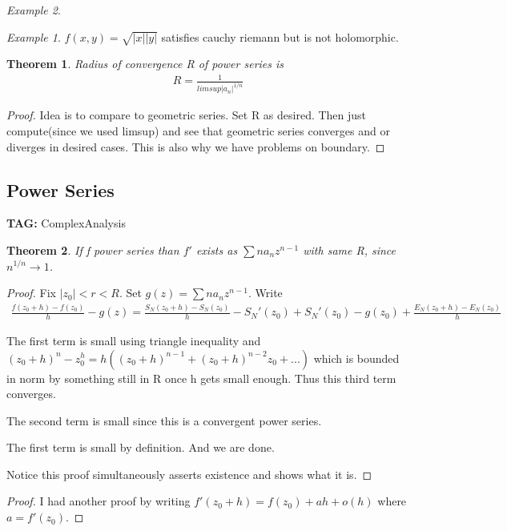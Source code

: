 \documentclass[11pt]{article}
\newtheorem{theorem}{Theorem}
\theoremstyle{remark}
\newtheorem{example}{Example}
\begin{document}
\begin{example}
\begin{example}
	$f(x,y) = \sqrt{|x||y|}$ satisfies cauchy riemann but is  not holomorphic. 
\end{example}

\begin{theorem}
	Radius of convergence R of power series is
	\begin{align*}
		R = \frac{1}{limsup |a_n|^{1/n}}
	\end{align*}
\end{theorem}

\begin{proof}
	Idea is to compare to geometric series. Set R as desired. Then just compute(since we used limsup) and see that geometric series converges and or diverges in desired cases. This is also why we have problems on boundary. 
\end{proof}

\subsection{Power Series}

\textbf{TAG:} ComplexAnalysis

\begin{theorem}
	If f power series than $f'$ exists as $\sum n a_n z^{n-1}$ with same R, since $n^{1/n} \to 1$. 
\end{theorem}

\begin{proof}
	Fix $|z_0| < r < R$. Set $g(z) = \sum na_nz^{n-1}$. Write
	\begin{align*}
		\frac{f(z_0+h)-f(z_0)}{h} - g(z) = \frac{S_N(z_0+h)-S_N(z_0)}{h} - S_N'(z_0) + S_N'(z_0)-g(z_0) + \frac{E_N(z_0+h) - E_N(z_0)}{h}
	\end{align*}

	The first term is small using triangle inequality and $(z_0 + h)^n - z_0^h = h((z_0+h)^{n-1}+(z_0+h)^{n-2}z_0 + ...)$ which is bounded in norm by something still in R once h gets small enough. Thus this third term converges.

	The second term is small since this is a convergent power series.

	The first term is small by definition. And we are done.

	Notice this proof simultaneously asserts existence and shows what it is.
\end{proof}

\begin{proof}
	I had another proof by writing $f'(z_0 + h) = f(z_0) + ah + o(h)$ where $a = f'(z_0)$.
\end{proof}


\end{example}
\end{document}
